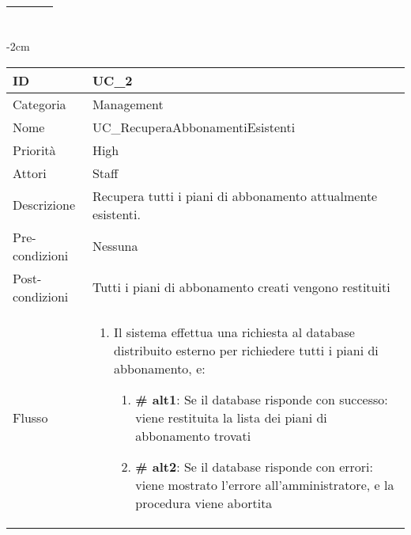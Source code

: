 \begin{center}
\begin{table}[bp]
\begin{tabular}{ |p{2.6cm}|p{13cm}|  }
\begin{enumerate}
			\end{enumerate}\\\hline
\end{tabular}
\label{table_use_case:1}\newline
\end{table}

\begin{table}[bp]
    \centering
    \addtolength{\leftskip} {-2cm}
\begin{tabular}{ |p{2.6cm}|p{13cm}|  }
\hline
ID & UC\_2 \\\hline
Categoria & Management\\\hline
Nome & UC\_RecuperaAbbonamentiEsistenti\\\hline
Priorità & High \\\hline
Attori &  Staff \\\hline
Descrizione & Recupera tutti i piani di abbonamento attualmente esistenti.\\\hline
Pre-condizioni &  Nessuna \\\hline
Post-condizioni &  Tutti i piani di abbonamento creati vengono restituiti\\\hline
Flusso &  	\vspace{-5mm} \begin{enumerate}
			\item Il sistema effettua una richiesta al database distribuito esterno per richiedere tutti i piani di abbonamento, e:
				\begin{enumerate}[  ]
				\item \textbf{\# alt1}: Se il database risponde con successo: viene restituita la lista dei piani di abbonamento trovati
				\item \textbf{\# alt2}: Se il database risponde con errori: viene mostrato l'errore all'amministratore, e la procedura viene abortita
				\end{enumerate}
		\end{enumerate}\\\hline
\end{tabular}
\label{table_use_case:2}\newline
\end{table}


\end{center}

